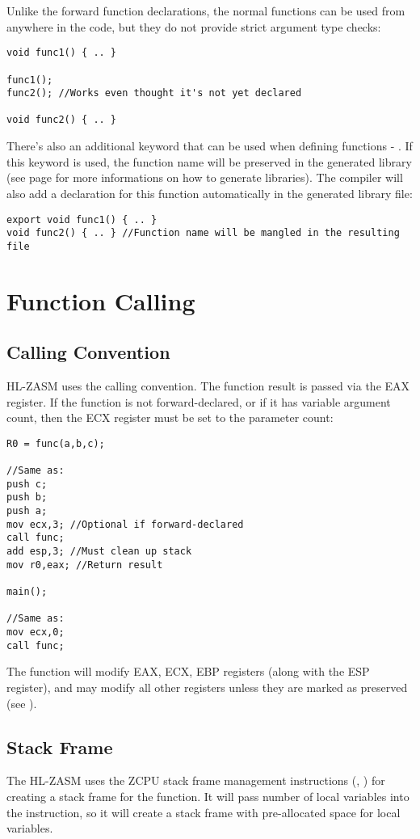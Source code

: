 Unlike the forward function declarations, the normal functions can be used from anywhere in the code, but they do not provide strict argument type checks:
\begin{verbatim}
void func1() { .. }

func1();
func2(); //Works even thought it's not yet declared

void func2() { .. }
\end{verbatim}

There's also an additional keyword that can be used when defining functions - . If this keyword is used, the function name will be preserved in the generated library (see page \pageref{libgen} for more informations on how to generate libraries). The compiler will also add a declaration for this function automatically in the generated library file:
\begin{verbatim}
export void func1() { .. }
void func2() { .. } //Function name will be mangled in the resulting file
\end{verbatim}


\section{Function Calling}
\subsection{Calling Convention}
HL-ZASM uses the  calling convention. The function result is passed via the EAX register. If the function is not forward-declared, or if it has variable argument count, then the ECX register must be set to the parameter count:
\begin{verbatim}
R0 = func(a,b,c);

//Same as:
push c;
push b;
push a;
mov ecx,3; //Optional if forward-declared
call func;
add esp,3; //Must clean up stack
mov r0,eax; //Return result

main();

//Same as:
mov ecx,0;
call func;
\end{verbatim}

The function will modify EAX, ECX, EBP registers (along with the ESP register), and may modify all other registers unless they are marked as preserved (see \pageref{preserve}).

\subsection{Stack Frame}
The HL-ZASM uses the ZCPU stack frame management instructions (, ) for creating a stack frame for the function. It will pass number of local variables into the  instruction, so it will create a stack frame with pre-allocated space for local variables.

